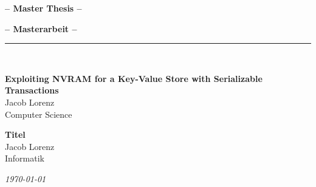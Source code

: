 %
\vspace{2.0cm}
%
\begin{center}
\begin{en}
    \Large{\textbf{--  Master Thesis --}}
\end{en}
\begin{de}
    \Large{\textbf{--  Masterarbeit --}}
\end{de}
    \rule{\textwidth}{0.6pt}\\[0.5cm]
\begin{en}
    \Large{\textbf{Exploiting NVRAM for a Key-Value Store with Serializable Transactions}}\\[3.0cm]
    \Large{Jacob Lorenz}\\
    \Large{Computer Science}\\
\end{en}
\begin{de}
    \Large{\textbf{Titel}}\\[3.0cm]
    \Large{Jacob Lorenz}\\
    \Large{Informatik}\\
\end{de}
\end{center}
%
\begin{center}
	 \large{\textit{\today}}
\end{center}
%
\vfill
\begin{center}
	\large
\begin{en}
        \\[0.2em]
        \\[0.2em]
        \\[0.2em]
\end{en}
\begin{de}
        \\[0.2em]
        \\[0.2em]
        \\[0.2em]
\end{de}
	\normalsize
\end{center}
%
